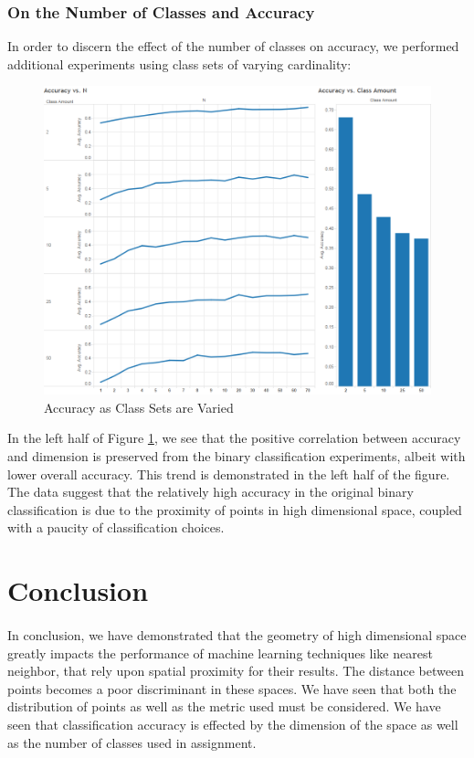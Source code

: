 \documentclass{article}
\begin{document}
\subsubsection{On the Number of Classes and Accuracy}
In order to discern the effect of the number of classes on accuracy, we performed additional experiments using class sets of varying cardinality:
\begin{figure}[H]
    \centering
        \includegraphics[width=\textwidth]{exp1-2-varying_classes.png}
    \caption{Accuracy as Class Sets are Varied}\label{fig:exp1-2-varclass}
\end{figure}
In the left half of Figure \ref{fig:exp1-2-varclass}, we see that the positive correlation between accuracy and dimension is preserved from the binary classification experiments, albeit with lower overall accuracy. This trend is demonstrated in the left half of the figure. The data suggest that the relatively high accuracy in the original binary classification is due to the proximity of points in high dimensional space, coupled with a paucity of classification choices.
\section{Conclusion}
\paragraph{}
In conclusion, we have demonstrated that the geometry of high dimensional space greatly impacts the performance of machine learning techniques like nearest neighbor, that rely upon spatial proximity for their results. The distance between points becomes a poor discriminant in these spaces. We have seen that both the distribution of points as well as the metric used must be considered. We have seen that classification accuracy is effected by the dimension of the space as well as the number of classes used in assignment.
\end{document}

